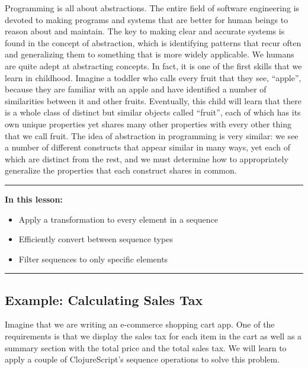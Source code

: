\documentclass[10pt,twoside,openright]{memoir}
\begin{document}
Programming is all about abstractions. The entire field of software
engineering is devoted to making programs and systems that are better
for human beings to reason about and maintain. The key to making clear
and accurate systems is found in the concept of abstraction, which is
identifying patterns that recur often and generalizing them to something
that is more widely applicable. We humans are quite adept at abstracting
concepts. In fact, it is one of the first skills that we learn in
childhood. Imagine a toddler who calls every fruit that they see,
``apple'', because they are familiar with an apple and have identified a
number of similarities between it and other fruits. Eventually, this
child will learn that there is a whole class of distinct but similar
objects called ``fruit'', each of which has its own unique properties
yet shares many other properties with every other thing that we call
fruit. The idea of abstraction in programming is very similar: we see a
number of different constructs that appear similar in many ways, yet
each of which are distinct from the rest, and we must determine how to
appropriately generalize the properties that each construct shares in
common.

\begin{center}\rule{0.5\linewidth}{0.5pt}\end{center}

\textbf{In this lesson:}

\begin{itemize}
\tightlist
\item
  Apply a transformation to every element in a sequence
\item
  Efficiently convert between sequence types
\item
  Filter sequences to only specific elements
\end{itemize}

\begin{center}\rule{0.5\linewidth}{0.5pt}\end{center}


\subsection{Example: Calculating Sales Tax}

Imagine that we are writing an e-commerce shopping cart app. One of the
requirements is that we display the sales tax for each item in the cart
as well as a summary section with the total price and the total sales
tax. We will learn to apply a couple of ClojureScript's sequence
operations to solve this problem.
\end{document}
